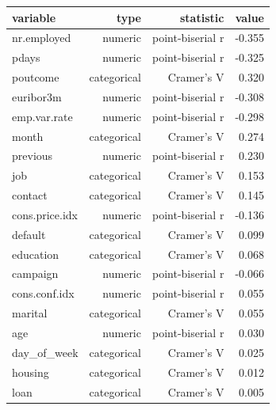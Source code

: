 \begin{tabular}{lrrr}
\toprule
variable & type & statistic & value \\
\midrule
nr.employed & numeric & point-biserial r & -0.355 \\
pdays & numeric & point-biserial r & -0.325 \\
poutcome & categorical & Cramer's V & 0.320 \\
euribor3m & numeric & point-biserial r & -0.308 \\
emp.var.rate & numeric & point-biserial r & -0.298 \\
month & categorical & Cramer's V & 0.274 \\
previous & numeric & point-biserial r & 0.230 \\
job & categorical & Cramer's V & 0.153 \\
contact & categorical & Cramer's V & 0.145 \\
cons.price.idx & numeric & point-biserial r & -0.136 \\
default & categorical & Cramer's V & 0.099 \\
education & categorical & Cramer's V & 0.068 \\
campaign & numeric & point-biserial r & -0.066 \\
cons.conf.idx & numeric & point-biserial r & 0.055 \\
marital & categorical & Cramer's V & 0.055 \\
age & numeric & point-biserial r & 0.030 \\
day\_of\_week & categorical & Cramer's V & 0.025 \\
housing & categorical & Cramer's V & 0.012 \\
loan & categorical & Cramer's V & 0.005 \\
\bottomrule
\end{tabular}